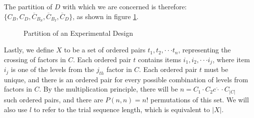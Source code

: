 The partition of $D$ with which we are concerned is therefore: $\{C_B, C_D, \overline{C}_{B_S}, \overline{C}_{B_I}, \overline{C}_D\}$, as shown in figure \ref{fig:partition}.


\begin{figure}[htb]
\centering
{}
\caption{Partition of an Experimental Design}
\label{fig:partition}
\end{figure}

Lastly, we define $X$ to be a set of ordered pairs $t_1, t_2, \cdot\cdot\cdot t_n$, representing the crossing of factors in $C$. Each ordered pair $t$ contains items $i_1, i_2, \cdot\cdot\cdot i_j$, where item $i_j$ is one of the levels from the $j_{th}$ factor in $C$. Each ordered pair $t$ must be unique, and there is an ordered pair for every possible combination of levels from factors in $C$. By the multiplication principle, there will be $n = C_1 \cdot C_2 c\dot\cdot\cdot C_{|C|}$ such ordered pairs, and there are $P(n, n) = n!$ permutations of this set. We will also use $l$ to refer to the trial sequence length, which is equivalent to $|X|$.



